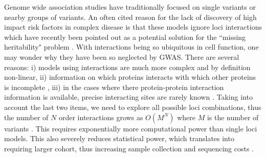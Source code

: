 

Genome wide association studies have traditionally focused on single variants or nearby groups of variants. An often cited reason for the lack of discovery of high impact risk factors in complex disease is that these models ignore loci interactions \cite{cordell2009detecting} which have recently been pointed out as a potential solution for the ``missing heritability" problem \cite{zuk2012mystery, zuk2014searching}. With interactions being so ubiquitous in cell function, one may wonder why they have been so neglected by GWAS. There are several reasons: i) models using interactions are much more complex \cite{gao2010classification} and by definition non-linear, ii) information on which proteins interacts with which other proteins is incomplete \cite{venkatesan2009empirical}, iii) in the cases where there protein-protein interaction information is available, precise interacting sites are rarely known \cite{venkatesan2009empirical}. Taking into account the last two items, we need to explore all possible loci combinations, thus the number of $N$ order interactions grows as $O(M^N)$ where $M$ is the number of variants \cite{de2013emerging}. This requires exponentially more computational power than single loci models. This also severely reduces statistical power, which translates into requiring larger cohort, thus increasing sample collection and sequencing costs \cite{de2013emerging}.

